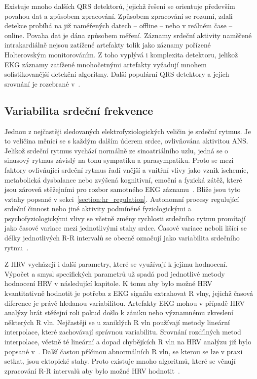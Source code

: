 Existuje mnoho dalších QRS detektorů, jejichž řešení se orientuje především
povahou dat a způsobem zpracování. Způsobem zpracování se rozumí, zdali detekce
probíhá na již naměřených datech -- offline -- nebo v reálném čase -- online.
Povaha dat je dána způsobem měření. Záznamy srdeční aktivity naměřené
intrakardiálně nejsou zatížené artefakty tolik jako záznamy pořízené
Holterovským monitorováním. Z toho vyplývá i komplexita detektoru, jelikož EKG
záznamy zatížené mnohočetnými artefakty vyžadují mnohem sofistikovanější
detekční algoritmy. Další populární QRS detektory a jejich srovnání je rozebrané
v~\cite{Kohler2002,Canento2012,Vaneghi2012,Alvarez2013,Karpagachelvi2010}.

\subsection{Variabilita srdeční frekvence}
\label{section:hrv}
Jednou z nejčastěji sledovaných elektrofyziologických veličin je srdeční rytmus.
Je to veličina měnící se s každým dalším úderem srdce, ovlivňována aktivitou
ANS. Jelikož srdeční rytmus vychází normálně ze sinoatriálního uzlu, jedná se o
sinusový rytmus závislý na tonu sympatiku a parasympatiku. Proto se mezi faktory
ovlivňující srdeční rytmus řadí vnější a vnitřní vlivy jako vznik ischemie,
metabolická dysbalance nebo zvýšená kognitivní, emoční a fyzická zátěž, které
jsou zároveň stěžejními pro rozbor samotného EKG záznamu~\cite{Pumprla2014}.
Blíže jsou tyto vztahy popsané v sekci~\ref{section:hr_regulation}. Autonomní
procesy regulující srdeční činnost nebo jiné aktivity podmíněné fyziologickými a
psychofyziologickými vlivy se včetně změny rychlosti srdečního rytmu promítají
jako časové variace mezi jednotlivými stahy srdce. Časové variace neboli lišící
se délky jednotlivých R-R intervalů se obecně označují jako variabilita
srdečního rytmu~\cite{Pumprla2014,Rajendra2007}.

Z HRV vycházejí i další parametry, které se využívají k jejímu hodnocení.
Výpočet a smysl specifických parametrů už spadá pod jednotlivé metody hodnocení
HRV v následující kapitole. K tomu aby bylo možné HRV kvantitativně hodnotit je
potřeba z EKG signálu extrahovat R vlny, jejichž časová diference je právě
hledanou variabilitou. Artefakty EKG mohou v případě HRV analýzy hrát stěžejní
roli pokud došlo k zániku nebo významnému zkreslení některých R vln. Nejčastěji
se u zaniklých R vln používají metody lineární interpolace, které zachovávají
správnou variabilitu. Srovnání rozdílných metod interpolace, včetně té lineární
a dopad chybějících R vln na HRV analýzu již bylo popsané
v~\cite{Kim2007,Peltola2012,Morelli2019}. Další častou příčinou abnormálních R
vln, se kterou se lze v praxi setkat, jsou ektopické stahy. Proto existuje mnoho
algoritmů, které se věnují zpracování R-R intervalů aby bylo možné HRV
hodnotit~\cite{Lipponen2019}.

